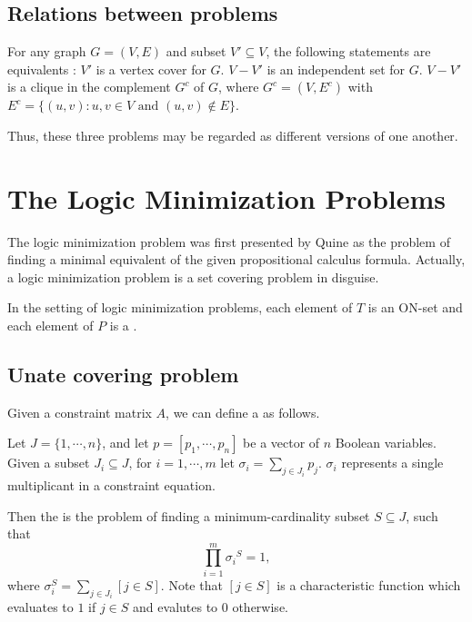 \documentclass{note}
\begin{document}
\subsection{Relations between problems}
\begin{lemma}
For any graph $G = (V, E)$ and subset $V' \subseteq V$, the following
statements are equivalents \cite{GJ79}:
\ben
\w [(a)] $V'$ is a vertex cover for $G$.
\w [(b)] $V - V'$ is an independent set for $G$.
\w [(c)] $V - V'$ is a clique in the complement $G^c$ of $G$, where $G^c =
  (V, E^c)$ with $E^c = \{(u, v) : u, v \in V \mbox{\ and\ } (u, v) \not\in
E\}$. 
\een
\end{lemma}
Thus, these three problems may be regarded as different versions of one another.



\section{The Logic Minimization Problems}
The logic minimization problem was first presented by Quine
as the problem of finding a minimal equivalent of the given
propositional calculus formula.
Actually, a logic minimization problem is a set covering problem
in disguise.

In the setting of logic minimization problems,  each 
element of $T$ is an ON-set 
and each element of $P$ is a . 

\subsection{Unate covering problem}
\begin{definition}
Given a constraint matrix $A$, we can define a 
as follows.
\end{definition}


\begin{definition}
Let $J = \{1, \cdots, n\}$, and let $p = [p_1, \cdots, p_n]$ be a vector
of $n$ Boolean variables. 
Given a subset $J_i \subseteq J$, for $i = 1, \cdots, m$
let $\sigma_i = \sum_{j \in J_i} p_j$.
$\sigma_i$ represents a single multiplicant in a constraint equation.

Then the  is the problem of 
finding a minimum-cardinality subset $S \subseteq J$, 
such that
	\[ \prod_{i=1}^m {\sigma_i}^S = 1,\]
where 
$\sigma_i^S = \sum_{j \in J_i}[j \in S]$.
Note that $[j \in S]$ is a characteristic function which evaluates
to $1$ if $j \in S$ and evalutes to $0$ otherwise.
\end{definition}
\end{document}

